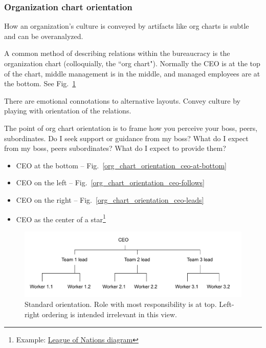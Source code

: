 \subsubsection{Organization chart orientation
\label{org-chart-orientation}}

How an organization's culture is conveyed by artifacts like org charts is subtle and can be overanalyzed. 

A common method of describing relations within the bureaucracy is the organization chart (colloquially, the ``org chart"). Normally the CEO is at the top of the chart, middle management is in the middle, and managed employees are at the bottom. See Fig.~\ref{org_chart_orientation_ceo-at-top} 

There are emotional connotations to alternative layouts. Convey culture by playing with orientation of the relations.

The point of org chart orientation is to frame how you perceive your boss, peers, subordinates. Do I seek support or guidance from my boss? What do I expect from my boss, peers subordinates? What do I expect to provide them?

\begin{itemize}
\item CEO at the bottom -- Fig.~\ref{org_chart_orientation_ceo-at-bottom}
\item CEO on the left -- Fig.~\ref{org_chart_orientation_ceo-follows}
\item CEO on the right -- Fig.~\ref{org_chart_orientation_ceo-leads}
\item CEO as the center of a star\footnote{Example: \href{https://en.wikipedia.org/wiki/File:League_of_Nations_Organization.png}{League of Nations diagram}}
\end{itemize}


\begin{figure}
\includegraphics[width=1\textwidth]{images/org-chart-orientation-ceo-at-top.pdf}
\caption{Standard orientation. Role with most responsibility is at top. Left-right ordering is intended irrelevant in this view.}
\label{org_chart_orientation_ceo-at-top}
\end{figure}


